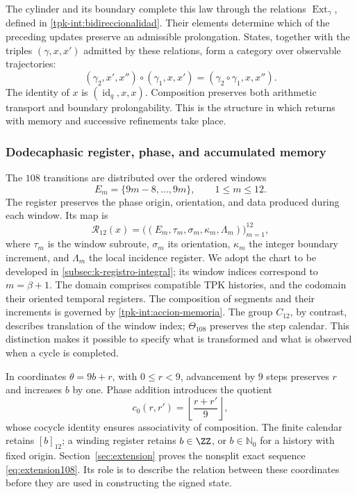 The cylinder and its boundary complete this law through the relations
\(\operatorname{Ext}_\gamma\), defined in
\ref{tpk-int:bidireccionalidad}. Their elements determine which of
the preceding updates preserve an admissible prolongation.
States, together with the triples \((\gamma,x,x')\) admitted by
these relations, form a category over observable trajectories:
\[
 (\gamma_2,x',x'')\circ(\gamma_1,x,x')
     =(\gamma_2\circ\gamma_1,x,x'').
\]
The identity of \(x\) is \((\operatorname{id}_q,x,x)\).
Composition preserves both arithmetic transport and boundary
prolongability. This is the structure in which returns with
memory and successive refinements take place.

\subsubsection{Dodecaphasic register, phase, and accumulated memory}
\label{tpk-int:dodecafase}

The \(108\) transitions are distributed over the ordered windows
\[
 E_m=\{9m-8,\ldots,9m\},\qquad 1\leq m\leq12.
\]
The register preserves the phase origin, orientation, and data
produced during each window. Its map is
\[
 \mathcal R_{12}(x)=
 \bigl((E_m,\tau_m,\sigma_m,\kappa_m,\Lambda_m)\bigr)_{m=1}^{12},
\]
where \(\tau_m\) is the window subroute, \(\sigma_m\) its
orientation, \(\kappa_m\) the integer boundary increment, and
\(\Lambda_m\) the local incidence register. We adopt the chart
to be developed in \ref{subsec:k-registro-integral}; its window
indices correspond to \(m=\beta+1\).
The domain comprises compatible TPK
histories, and the codomain their oriented temporal registers. The
composition of segments and their increments is governed by
\eqref{tpk-int:accion-memoria}. The group \(C_{12}\), by
contrast, describes translation of the window index; \(\Theta_{108}\) preserves
the step calendar. This distinction makes it possible to specify what is transformed
and what is observed when a cycle is completed.

In coordinates \(\theta=9b+r\), with \(0\leq r<9\), advancement
by \(9\) steps preserves \(r\) and increases \(b\) by one.
Phase addition introduces the quotient
\[
 c_0(r,r')=\left\lfloor\frac{r+r'}9\right\rfloor,
\]
whose cocycle identity ensures associativity of composition.
The finite calendar retains \([b]_{12}\); a winding
register retains \(b\in\ZZ\), or \(b\in\mathbb N_0\) for
a history with fixed origin. Section~\ref{sec:extension} proves
the nonsplit exact sequence \eqref{eq:extension108}. Its role is to
describe the relation between these coordinates before they are used in
constructing the signed state.

